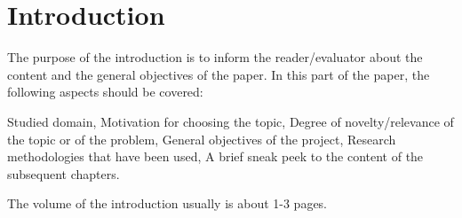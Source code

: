 \chapter*{Introduction}
\par The purpose of the introduction is to inform the reader/evaluator about the content and the general objectives of the paper. In this part of the paper, the following aspects should be covered:
\begin{itemize}
    \hitem Studied domain,
    \hitem Motivation for choosing the topic,
    \hitem Degree of novelty/relevance of the topic or of the problem,
    \hitem General objectives of the project,
    \hitem Research methodologies that have been used,
    \hitem A brief sneak peek to the content of the subsequent chapters.
\end{itemize}
The volume of the introduction usually is about 1-3 pages.